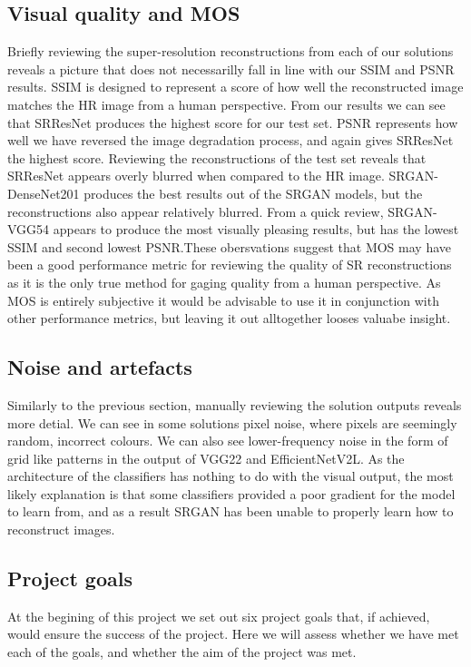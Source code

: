 \subsection{Visual quality and MOS}
Briefly reviewing the super-resolution reconstructions from each of our solutions reveals a picture that does not necessarilly fall in line with our SSIM and PSNR results. SSIM is designed to represent a score of how well the reconstructed image matches the HR image from a human perspective. From our results we can see that SRResNet produces the highest score for our test set. PSNR represents how well we have reversed the image degradation process, and again gives SRResNet the highest score. Reviewing the reconstructions of the test set reveals that SRResNet appears overly blurred when compared to the HR image. SRGAN-DenseNet201 produces the best results out of the SRGAN models, but the reconstructions also appear relatively blurred. From a quick review, SRGAN-VGG54 appears to produce the most visually pleasing results, but has the lowest SSIM and second lowest PSNR.\@ These obersvations suggest that MOS may have been a good performance metric for reviewing the quality of SR reconstructions as it is the only true method for gaging quality from a human perspective. As MOS is entirely subjective it would be advisable to use it in conjunction with other performance metrics, but leaving it out alltogether looses valuabe insight.

\subsection{Noise and artefacts}
Similarly to the previous section, manually reviewing the solution outputs reveals more detial. We can see in some solutions pixel noise, where pixels are seemingly random, incorrect colours. We can also see lower-frequency noise in the form of grid like patterns in the output of VGG22 and EfficientNetV2L. As the architecture of the classifiers has nothing to do with the visual output, the most likely explanation is that some classifiers provided a poor gradient for the model to learn from, and as a result SRGAN has been unable to properly learn how to reconstruct images.

\subsection{Project goals}
At the begining of this project we set out six project goals that, if achieved, would ensure the success of the project. Here we will assess whether we have met each of the goals, and whether the aim of the project was met.

